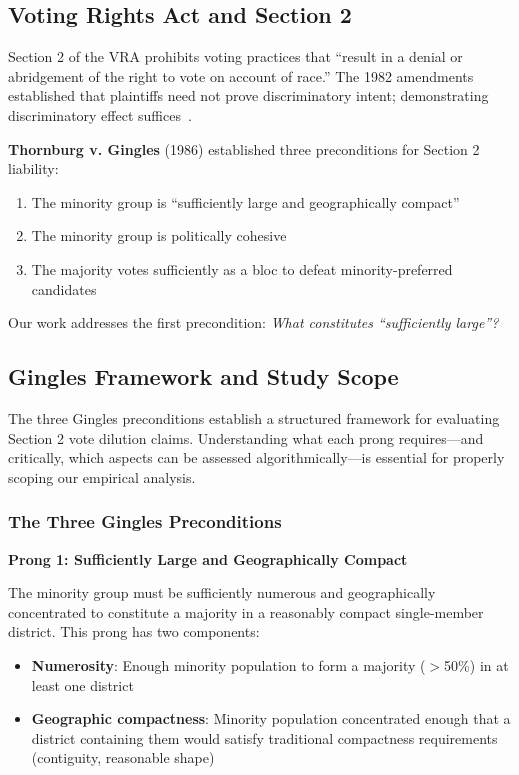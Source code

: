 \subsection{Voting Rights Act and Section 2}

Section 2 of the VRA prohibits voting practices that ``result in a denial or abridgement of the right to vote on account of race.'' The 1982 amendments established that plaintiffs need not prove discriminatory intent; demonstrating discriminatory effect suffices~\citep{vra1982}.

\textbf{Thornburg v. Gingles} (1986) established three preconditions for Section 2 liability:
\begin{enumerate}
    \item The minority group is ``sufficiently large and geographically compact''
    \item The minority group is politically cohesive
    \item The majority votes sufficiently as a bloc to defeat minority-preferred candidates
\end{enumerate}

Our work addresses the first precondition: \emph{What constitutes ``sufficiently large''?}

\subsection{Gingles Framework and Study Scope}

The three Gingles preconditions establish a structured framework for evaluating Section 2 vote dilution claims. Understanding what each prong requires---and critically, which aspects can be assessed algorithmically---is essential for properly scoping our empirical analysis.

\subsubsection{The Three Gingles Preconditions}

\textbf{Prong 1: Sufficiently Large and Geographically Compact}

The minority group must be sufficiently numerous and geographically concentrated to constitute a majority in a reasonably compact single-member district. This prong has two components:

\begin{itemize}
    \item \textbf{Numerosity}: Enough minority population to form a majority ($>$50\%) in at least one district
    \item \textbf{Geographic compactness}: Minority population concentrated enough that a district containing them would satisfy traditional compactness requirements (contiguity, reasonable shape)
\end{itemize}

